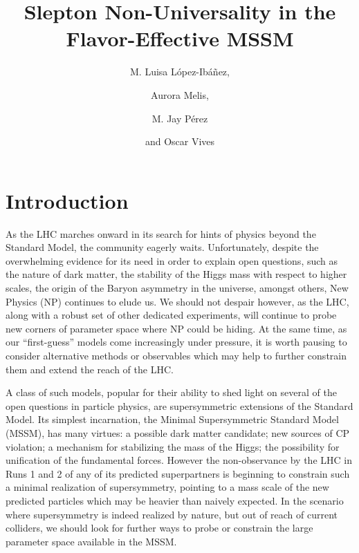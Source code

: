 \documentclass[a4paper,11pt]{article}
\title{\boldmath Slepton Non-Universality in the Flavor-Effective MSSM}
\author[a]{M. Luisa L\'opez-Ib\'a\~nez,}
\author[a]{Aurora Melis,}
\author[a,b]{M. Jay P\'erez}
\author[a]{and Oscar Vives}
\affiliation[a]{Departament de F\'{i}sica T\`{e}orica, Universitat de Val\`{e}ncia and IFIC, Universitat de Val\`{e}ncia-CSIC  \\
	Dr. Moliner 50, E-46100 Burjassot (Val\`{e}ncia), Spain}
\affiliation[b]{Valencia State College, Osceola Campus \\
	1800 Denn John Ln, Kissimmee, FL, USA}
\begin{document}
 
\maketitle
\flushbottom
\section{Introduction}
\label{s:intoduction}
%

As the LHC marches onward in its search for hints of physics beyond the Standard Model, the community eagerly waits. Unfortunately, despite the overwhelming evidence for its need in order to explain open questions, such as the nature of dark matter, the stability of the Higgs mass with respect to higher scales, the origin of the Baryon asymmetry in the universe, amongst others, New Physics (NP) continues to elude us. We should not  despair however, as the LHC, along with a robust set of other dedicated experiments, will continue to probe new corners of parameter space where NP could be hiding. At the same time, as our ``first-guess'' models come increasingly under pressure, it is worth pausing to consider alternative methods or observables which may help to further constrain them and extend the reach of the LHC.  

A class of such models, popular for their ability to shed light on several of the open questions in particle physics, are supersymmetric extensions of the Standard Model. Its simplest incarnation, the Minimal Supersymmetric Standard Model (MSSM), has many virtues: a possible dark matter candidate; new sources of CP violation; a mechanism for stabilizing the mass of the Higgs; the possibility for unification of the fundamental forces. However the non-observance by the LHC in Runs 1 and 2 of any of its predicted superpartners is beginning to constrain such a minimal realization of supersymmetry, pointing to a mass scale of the new predicted particles which may be heavier than naively expected. In the scenario where supersymmetry is indeed realized by nature, but out of reach of current colliders, we should look for further ways to probe or constrain the large parameter space available in the MSSM.   
\end{document}
